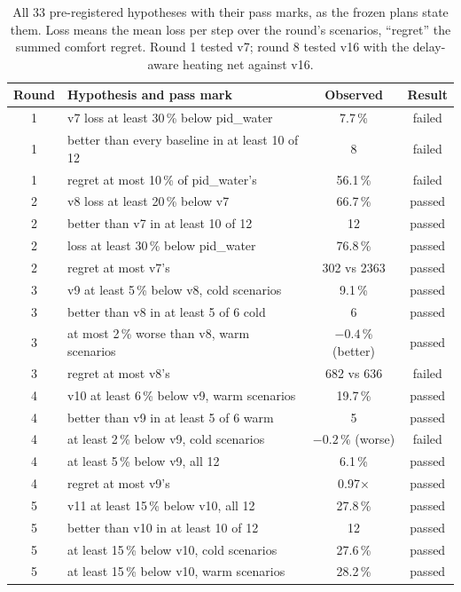\documentclass{article}
\begin{document}
\begin{table}[!htb]\centering
\caption{All 33 pre-registered hypotheses with their pass marks, as the frozen plans state them. Loss means the mean loss per step over the round's scenarios, ``regret'' the summed comfort regret. Round 1 tested v7; round 8 tested v16 with the delay-aware heating net against v16.}\label{tab:hyp}
\footnotesize
\begin{tabular}{clcc}\toprule
Round & Hypothesis and pass mark & Observed & Result\\\midrule
1 & v7 loss at least 30\,\% below pid\_water & 7.7\,\% & failed\\
1 & better than every baseline in at least 10 of 12 & 8 & failed\\
1 & regret at most 10\,\% of pid\_water's & 56.1\,\% & failed\\\midrule
2 & v8 loss at least 20\,\% below v7 & 66.7\,\% & passed\\
2 & better than v7 in at least 10 of 12 & 12 & passed\\
2 & loss at least 30\,\% below pid\_water & 76.8\,\% & passed\\
2 & regret at most v7's & 302 vs 2363 & passed\\\midrule
3 & v9 at least 5\,\% below v8, cold scenarios & 9.1\,\% & passed\\
3 & better than v8 in at least 5 of 6 cold & 6 & passed\\
3 & at most 2\,\% worse than v8, warm scenarios & $-0.4$\,\% (better) & passed\\
3 & regret at most v8's & 682 vs 636 & failed\\\midrule
4 & v10 at least 6\,\% below v9, warm scenarios & 19.7\,\% & passed\\
4 & better than v9 in at least 5 of 6 warm & 5 & passed\\
4 & at least 2\,\% below v9, cold scenarios & $-0.2$\,\% (worse) & failed\\
4 & at least 5\,\% below v9, all 12 & 6.1\,\% & passed\\
4 & regret at most v9's & 0.97$\times$ & passed\\\midrule
5 & v11 at least 15\,\% below v10, all 12 & 27.8\,\% & passed\\
5 & better than v10 in at least 10 of 12 & 12 & passed\\
5 & at least 15\,\% below v10, cold scenarios & 27.6\,\% & passed\\
5 & at least 15\,\% below v10, warm scenarios & 28.2\,\% & passed\\

\end{tabular}
\end{table}
\end{document}
